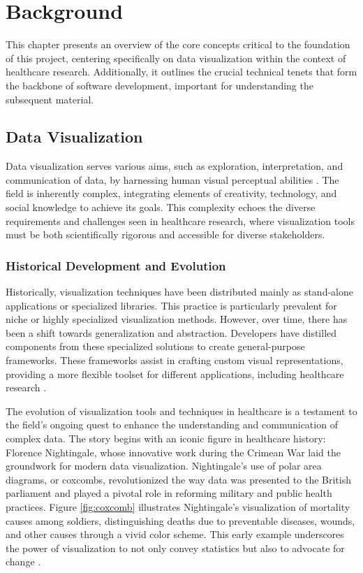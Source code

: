 \chapter{Background}\label{background}

\minitoc

This chapter presents an overview of the core concepts critical to the foundation of this project, centering specifically on data visualization within the context of healthcare research. Additionally, it outlines the crucial technical tenets that form the backbone of software development, important for understanding the subsequent material.

\section{Data Visualization}\label{data-visualization}

Data visualization serves various aims, such as exploration,
interpretation, and communication of data, by harnessing human visual
perceptual abilities
\cite{5}. The field is
inherently complex, integrating elements of creativity, technology, and
social knowledge to achieve its goals. This complexity echoes the
diverse requirements and challenges seen in healthcare research, where
visualization tools must be both scientifically rigorous and accessible
for diverse stakeholders.

\subsection{Historical Development and
Evolution}\label{historical-development-and-evolution}

Historically, visualization techniques have been distributed mainly as
stand-alone applications or specialized libraries. This practice is
particularly prevalent for niche or highly specialized visualization
methods. However, over time, there has been a shift towards
generalization and abstraction. Developers have distilled components
from these specialized solutions to create general-purpose frameworks.
These frameworks assist in crafting custom visual representations,
providing a more flexible toolset for different applications, including
healthcare research \cite{5}.

The evolution of visualization tools and techniques in healthcare is a testament to the field's ongoing quest to enhance the understanding and communication of complex data. The story begins with an iconic figure in healthcare history: Florence Nightingale, whose innovative work during the Crimean War laid the groundwork for modern data visualization. Nightingale's use of polar area diagrams, or coxcombs, revolutionized the way data was presented to the British parliament and played a pivotal role in reforming military and public health practices. Figure \ref{fig:coxcomb} illustrates Nightingale's visualization of mortality causes among soldiers, distinguishing deaths due to preventable diseases, wounds, and other causes through a vivid color scheme. This early example underscores the power of visualization to not only convey statistics but also to advocate for change \cite{soa7}.


